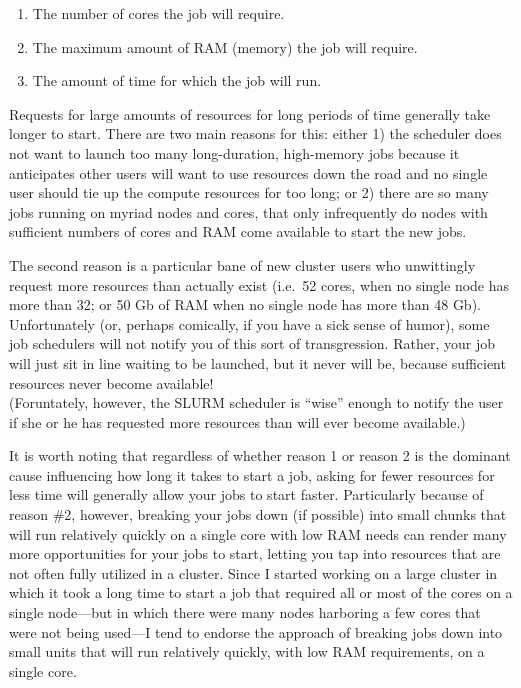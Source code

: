 \documentclass[]{krantz}
\providecommand{\tightlist}{%
  \setlength{\itemsep}{0pt}\setlength{\parskip}{0pt}}
\begin{document}
\begin{enumerate}
\def\labelenumi{\arabic{enumi}.}
\tightlist
\item
  The number of cores the job will require.
\item
  The maximum amount of RAM (memory) the job will require.
\item
  The amount of time for which the job will run.
\end{enumerate}

Requests for large amounts of resources for long periods of time generally take longer to start.
There are two main reasons for this: either 1) the scheduler does not want to launch too many
long-duration, high-memory jobs because it anticipates other users will want to use resources
down the road and no single user should tie up the compute resources
for too long; or 2) there are so many jobs running on myriad nodes and cores, that only
infrequently do nodes with sufficient numbers of cores and RAM come available to start
the new jobs.

The second reason is a particular bane of new cluster users who unwittingly request more resources
than actually exist (i.e.~52 cores, when no single node has more than 32; or 50 Gb of RAM when no single
node has more than 48 Gb). Unfortunately (or, perhaps comically, if you have a sick sense of
humor), some job schedulers will not notify you of this sort of transgression.
Rather, your job will just sit in line waiting to be launched, but it never will be, because sufficient
resources never become available!\\
(Foruntately, however, the SLURM scheduler is ``wise'' enough to notify the user if
she or he has requested more resources than will ever become available.)

It is worth noting that regardless of whether reason 1 or reason 2 is the dominant cause influencing
how long it takes to start a job, asking for fewer resources for less time will generally allow your
jobs to start faster. Particularly because of reason \#2, however, breaking your jobs down (if possible) into
small chunks that will run relatively quickly on a single core with low RAM needs can render many more
opportunities for your jobs to start, letting you tap into resources that are not often fully utilized
in a cluster. Since I started working on a large cluster in which it took a long time to start a job
that required all or most of the cores on a single node---but in which there were many nodes
harboring a few cores that were not being used---I tend to endorse the approach of breaking jobs
down into small units that will run relatively quickly, with low RAM requirements, on a
single core.
\end{document}
